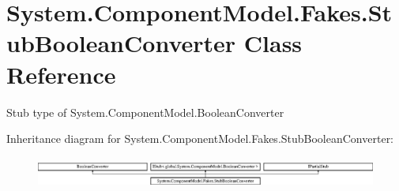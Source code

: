 \hypertarget{class_system_1_1_component_model_1_1_fakes_1_1_stub_boolean_converter}{\section{System.\-Component\-Model.\-Fakes.\-Stub\-Boolean\-Converter Class Reference}
\label{class_system_1_1_component_model_1_1_fakes_1_1_stub_boolean_converter}
}


Stub type of System.\-Component\-Model.\-Boolean\-Converter 


Inheritance diagram for System.\-Component\-Model.\-Fakes.\-Stub\-Boolean\-Converter\-:\begin{figure}[H]
\begin{center}
\leavevmode
\includegraphics[height=1.039926cm]{class_system_1_1_component_model_1_1_fakes_1_1_stub_boolean_converter}
\end{center}
\end{figure}
